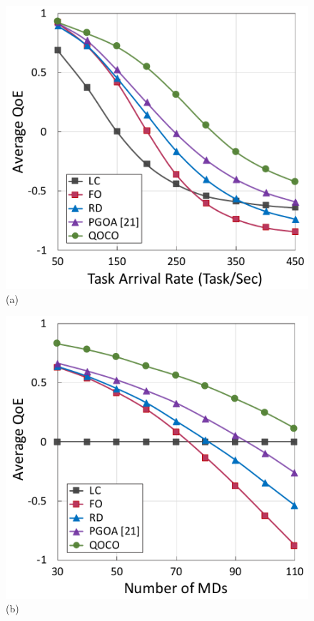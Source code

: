 \begin{frame}
	\begin{figure}
		\begin{minipage}[b]{0.47\linewidth}
			\centering
			\includegraphics[width=\textwidth]{444} 
			\hspace{0.6cm}(a)
		\end{minipage}
		\hspace{-0.2cm}
		\begin{minipage}[b]{0.47\linewidth}
			\centering
			\includegraphics[width=\textwidth]{445}
			\hspace{0.6cm}(b)
		\end{minipage}
		

\end{figure}
\end{frame}
